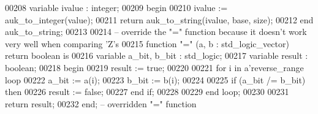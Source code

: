 \begin{DoxyCode}
00208         \textcolor{keywordflow}{variable} \textcolor{vhdlchar}{ivalue} \textcolor{vhdlchar}{:} \textcolor{comment}{integer};
00209 \textcolor{vhdlkeyword}{    begin}
00210         \textcolor{vhdlchar}{ivalue} \textcolor{vhdlchar}{:=} \textcolor{vhdlchar}{auk\_to\_integer}\textcolor{vhdlchar}{(}\textcolor{vhdlkeyword}{value}\textcolor{vhdlchar}{)};
00211         \textcolor{keywordflow}{return} \textcolor{vhdlchar}{auk\_to\_string}\textcolor{vhdlchar}{(}\textcolor{vhdlchar}{ivalue}\textcolor{vhdlchar}{,} \textcolor{vhdlkeyword}{base}\textcolor{vhdlchar}{,} \textcolor{vhdlchar}{size}\textcolor{vhdlchar}{)};
00212     \textcolor{keywordflow}{end} \textcolor{vhdlchar}{auk\_to\_string};
00213 
00214 \textcolor{keyword}{    -- override the "=" function because it doesn't work very well when comparing 'Z's}
00215     \textcolor{keywordflow}{function} "=" (a, b : \textcolor{comment}{std\_logic\_vector}) \textcolor{keywordflow}{return} \textcolor{comment}{boolean} \textcolor{keywordflow}{is}
00216         \textcolor{keywordflow}{variable} \textcolor{vhdlchar}{a\_bit}\textcolor{vhdlchar}{,} \textcolor{vhdlchar}{b\_bit} \textcolor{vhdlchar}{:} \textcolor{comment}{std\_logic};
00217         \textcolor{keywordflow}{variable} \textcolor{vhdlchar}{result} \textcolor{vhdlchar}{:} \textcolor{comment}{boolean};
00218 \textcolor{vhdlkeyword}{    begin}
00219         \textcolor{vhdlchar}{result} \textcolor{vhdlchar}{:=} \textcolor{vhdlchar}{true};
00220 
00221         \textcolor{keywordflow}{for} \textcolor{vhdlchar}{i} \textcolor{keywordflow}{in} \textcolor{vhdlchar}{a}\textcolor{vhdlchar}{'}\textcolor{vhdlkeyword}{reverse\_range} \textcolor{keywordflow}{loop}
00222             \textcolor{vhdlchar}{a\_bit} \textcolor{vhdlchar}{:=} \textcolor{vhdlchar}{a}\textcolor{vhdlchar}{(}\textcolor{vhdlchar}{i}\textcolor{vhdlchar}{)};
00223             \textcolor{vhdlchar}{b\_bit} \textcolor{vhdlchar}{:=} \textcolor{vhdlchar}{b}\textcolor{vhdlchar}{(}\textcolor{vhdlchar}{i}\textcolor{vhdlchar}{)};
00224 
00225             \textcolor{keywordflow}{if} \textcolor{vhdlchar}{(}\textcolor{vhdlchar}{a\_bit} \textcolor{vhdlchar}{/=} \textcolor{vhdlchar}{b\_bit}\textcolor{vhdlchar}{)} \textcolor{keywordflow}{then}
00226                 \textcolor{vhdlchar}{result} \textcolor{vhdlchar}{:=} \textcolor{vhdlchar}{false};
00227             \textcolor{keywordflow}{end} \textcolor{keywordflow}{if};
00228 
00229         \textcolor{keywordflow}{end} \textcolor{keywordflow}{loop};
00230 
00231         \textcolor{keywordflow}{return} \textcolor{vhdlchar}{result};
00232     \textcolor{keywordflow}{end};\textcolor{keyword}{ -- overridden "=" function}

\end{DoxyCode}
